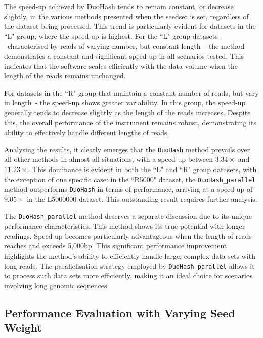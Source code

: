 	The speed-up achieved by DuoHash tends to remain constant, or decrease slightly, in the various methods presented when the seedset is set, regardless of the dataset being processed. This trend is particularly evident for datasets in the “L" group, where the speed-up is highest. For the “L" group datasets -~characterised by reads of varying number, but constant length~- the method demonstrates a constant and significant speed-up in all scenarios tested. This indicates that the software scales efficiently with the data volume when the length of the reads remains unchanged.
	
	For datasets in the “R" group that maintain a constant number of reads, but vary in length~- the speed-up shows greater variability. In this group, the speed-up generally tends to decrease slightly as the length of the reads increases. Despite this, the overall performance of the instrument remains robust, demonstrating its ability to effectively handle different lengths of reads.
	
	Analysing the results, it clearly emerges that the \verb|DuoHash| method prevails over all other methods in almost all situations, with a speed-up between $3.34\times$ and $11.23\times$. This dominance is evident in both the “L" and “R" group datasets, with the exception of one specific case: in the “R5000" dataset, the \verb|DuoHash_parallel| method outperforms \verb|DuoHash| in terms of performance, arriving at a speed-up of $9.05\times$ in the L5000000 dataset. This outstanding result requires further analysis. 
	
	The \verb|DuoHash_parallel| method deserves a separate discussion due to its unique performance characteristics. This method shows its true potential with longer readings. Speed-up becomes particularly advantageous when the length of reads reaches and exceeds 5,000bp. This significant performance improvement highlights the method's ability to efficiently handle large, complex data sets with long reads. The parallelisation strategy employed by \verb|DuoHash_parallel| allows it to process such data sets more efficiently, making it an ideal choice for scenarios involving long genomic sequences.
	
	


	\subsection{Performance Evaluation with Varying Seed Weight}
	\label{subsec:performance-varying-seed-weight}
	
